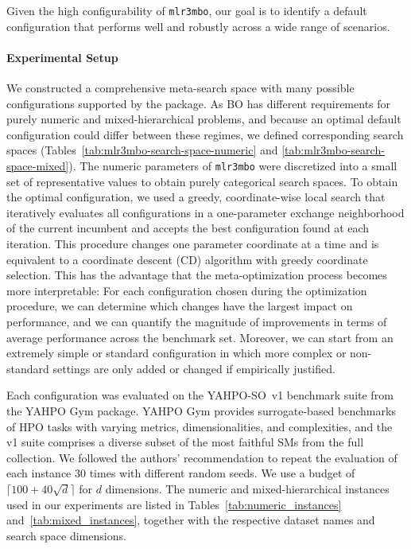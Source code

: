 \documentclass[12pt,letterpaper]{article}
\begin{document}
Given the high configurability of \texttt{mlr3mbo}, our goal is to identify a default configuration that performs well and robustly across a wide range of scenarios.

\paragraph{Experimental Setup}
We constructed a comprehensive meta-search space with many possible configurations supported by the package.
As BO has different requirements for purely numeric and mixed-hierarchical problems, and because an optimal default configuration could differ between these regimes, we defined corresponding search spaces (Tables~\ref{tab:mlr3mbo-search-space-numeric} and \ref{tab:mlr3mbo-search-space-mixed}).
The numeric parameters of \texttt{mlr3mbo} were discretized into a small set of representative values to obtain purely categorical search spaces.
To obtain the optimal configuration, we used a greedy, coordinate-wise local search that iteratively evaluates all configurations in a one-parameter exchange neighborhood of the current incumbent and accepts the best configuration found at each iteration.
This procedure changes one parameter coordinate at a time and is equivalent to a coordinate descent (CD) algorithm with greedy coordinate selection.
This has the advantage that the meta-optimization process becomes more interpretable:
For each configuration chosen during the optimization procedure, we can determine which changes have the largest impact on performance, and we can quantify the magnitude of improvements in terms of average performance across the benchmark set. Moreover, we can start from an extremely simple or standard configuration in which more complex or non-standard settings are only added or changed if empirically justified.

Each configuration was evaluated on the YAHPO-SO~v1 benchmark suite from the YAHPO Gym package\cite{pfisterer2022}.
YAHPO Gym provides surrogate-based benchmarks of HPO tasks with varying metrics, dimensionalities, and complexities, and the v1 suite comprises a diverse subset of the most faithful SMs from the full collection.
We followed the authors' recommendation to repeat the evaluation of each instance 30 times with different random seeds.
We use a budget of $\lceil 100 + 40 \sqrt{d} \rceil$ for $d$ dimensions.
The numeric and mixed-hierarchical instances used in our experiments are listed in Tables~\ref{tab:numeric_instances} and~\ref{tab:mixed_instances}, together with the respective dataset names and search space dimensions.
\end{document}
